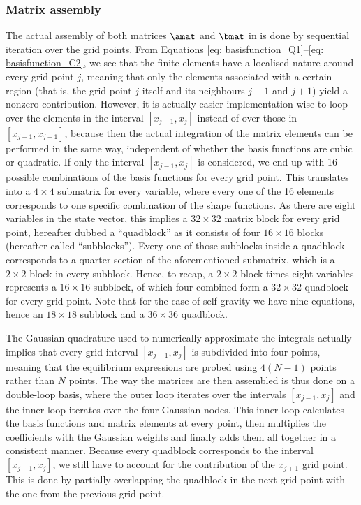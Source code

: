 \subsubsection{Matrix assembly}
The actual assembly of both matrices $\amat$ and $\bmat$ in {\legolas} is done by sequential iteration over the grid points. From Equations \eqref{eq: basisfunction_Q1}--\eqref{eq: basisfunction_C2}, we see that the finite elements have a localised nature around every grid point $j$, meaning that only the elements associated with a certain region (that is, the grid point $j$ itself and its neighbours $j - 1$ and $j + 1$) yield a nonzero contribution. However, it is actually easier implementation-wise to loop over the elements in the interval $[x_{j-1}, x_j]$ instead of over those in $[x_{j-1}, x_{j+1}]$, because then the actual integration of the matrix elements can be performed in the same way, independent of whether the basis functions are cubic or quadratic. If only the interval $[x_{j-1}, x_j]$ is considered, we end up with 16 possible combinations of the basis functions for every grid point. This translates into a $4 \times 4$ submatrix for every variable, where every one of the 16 elements corresponds to one specific combination of the shape functions. As there are eight variables in the state vector, this implies a $32 \times 32$ matrix block for every grid point, hereafter dubbed a ``quadblock'' as it consists of four $16 \times 16$ blocks (hereafter called ``subblocks''). Every one of those subblocks inside a quadblock corresponds to a quarter section of the aforementioned submatrix, which is a $2 \times 2$ block in every subblock. Hence, to recap, a $2 \times 2$ block times eight variables represents a $16 \times 16$ subblock, of which four combined form a $32 \times 32$ quadblock for every grid point. Note that for the case of self-gravity we have nine equations, hence an $18 \times 18$ subblock and a $36 \times 36$ quadblock.

The Gaussian quadrature used to numerically approximate the integrals actually implies that every grid interval
$[x_{j-1}, x_j]$ is subdivided into four points, meaning that the equilibrium expressions are probed using $4(N - 1)$ points rather than $N$ points. The way the matrices are then assembled is thus done on a double-loop basis, where the outer loop iterates over the intervals $[x_{j-1}, x_j]$ and the inner loop iterates over the four Gaussian nodes. This inner loop calculates the basis functions and matrix elements at every point, then multiplies the coefficients with the Gaussian weights and finally adds them all together in a consistent manner. Because every quadblock corresponds to the interval $[x_{j-1}, x_j]$, we still have to account for the contribution of the $x_{j+1}$ grid point. This is done by partially overlapping the quadblock in the next grid point with the one from the previous grid point.

